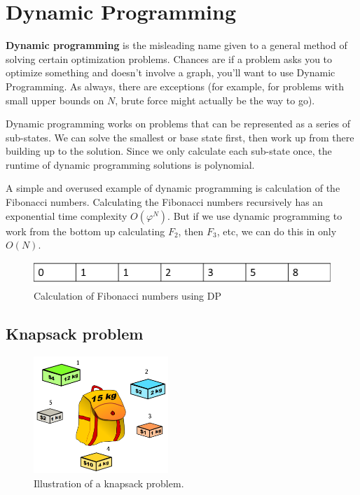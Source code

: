 \chapter{Dynamic Programming} \label{sec:dp}

\textbf{Dynamic programming} is the misleading name given to a general method of solving certain optimization problems.  Chances are if a problem asks you to optimize something and doesn't involve a graph, you'll want to use Dynamic Programming.  As always, there are exceptions  (for example, for problems with small upper bounds on $N$, brute force might actually be the way to go).

Dynamic programming works on problems that can be represented as a series of sub-states.  We can solve the smallest or base state first, then work up from there building up to the solution.  Since we only calculate each sub-state once, the runtime of dynamic programming solutions is polynomial.

A simple and overused example of dynamic programming is calculation of the Fibonacci numbers.  Calculating the Fibonacci numbers recursively has an exponential time complexity $O(\varphi^N)$.  But if we use dynamic programming to work from the bottom up calculating $F_2$, then $F_3$, etc, we can do this in only $O(N)$.

\begin{figure}[h]
\begin{center}
\includegraphics[width=6in]{images/fib-dp.png}
\end{center}
\caption{Calculation of Fibonacci numbers using DP}
\end{figure}

\section{Knapsack problem} \label{sec:knapsack}

\begin{figure}[ht]
\begin{center}
\includegraphics[width=2in]{images/knapsack.png}
\end{center}
\caption{Illustration of a knapsack problem.}
\label{fig:dp-backpack}
\end{figure}

